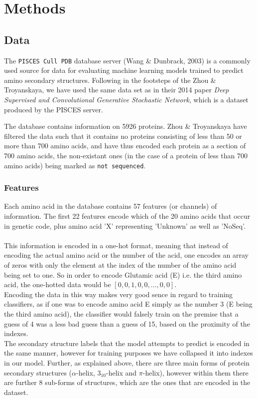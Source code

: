 \section{Methods}

\subsection{Data}
The \texttt{PISCES Cull PDB} database server (Wang \& Dunbrack, 2003) is a commonly used source for data for evaluating 
machine learning models trained to predict amino secondary structures. Following in the footsteps of the Zhou \& 
Troyanskaya, we have used the same data set as in their 2014 paper \textit{Deep Supervised and Convolutional Generative 
Stochastic Network}, which is a dataset produced by the PISCES server.

The database contains information on 5926 proteins. Zhou \& Troyanskaya have filtered the data such that it contains no proteins consisting of less than 50 or more than 700 amino acids, and have thus encoded each protein as a section of 700 amino acids, the non-existant ones (in the case of a protein of less than 700 amino acids) being marked as \texttt{not sequenced}.

\subsubsection{Features}
Each amino acid in the database contains 57 features (or channels) of information. The first 22 features encode which of the 20 amino acids that occur in genetic code, plus amino acid 'X' representing 'Unknown' as well as 'NoSeq'.\\
\\
This information is encoded in a one-hot format, meaning that instead of encoding the actual amino acid or the number of the acid, one encodes an array of zeros with only the element at the index of the number of the amino acid being set to one. So in order to encode Glutamic acid (E) i.e. the third amino acid, the one-hotted data would be $[0, 0, 1, 0, 0, ... , 0, 0]$. \\
Encoding the data in this way makes very good sence in regard to training classifiers, as if one was to encode amino acid E simply as the number 3 (E being the third amino acid), the classifier would falsely train on the premise that a guess of 4 was a less bad guess than a guess of 15, based on the proximity of the indexes.\\
The secondary structure labels that the model attempts to predict is encoded in the same manner, however for training purposes we have collapsed it into indexes in our model. Further, as explained above, there are three main forms of protein secondary structures ($\alpha$-helix, $3_{10}$-helix and $\pi$-helix), however within them there are further 8 sub-forms of structures, which are the ones that are encoded in the dataset.

